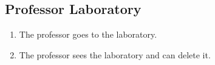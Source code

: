 \subsection{Professor Laboratory}

\begin{enumerate}
    \item The professor goes to the laboratory.
    \item The professor sees the laboratory and can delete it.
\end{enumerate}
